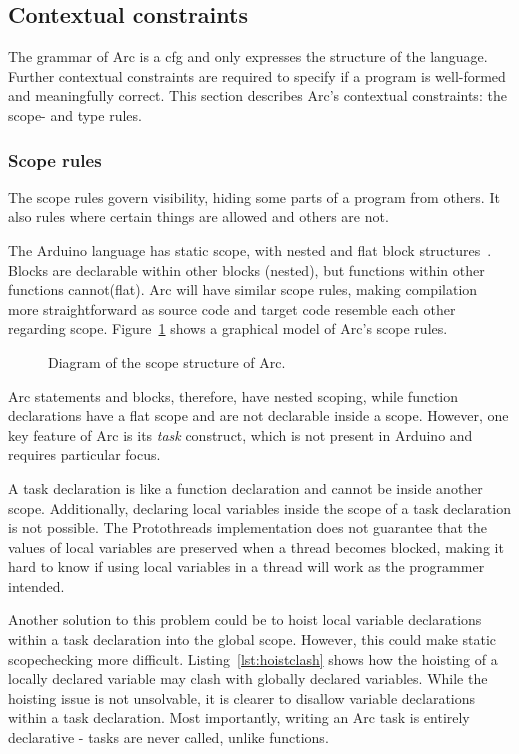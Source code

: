 \subsection{Contextual constraints}\label{subsec:contextualrestraints}
The grammar of Arc is a \gls{cfg} and only expresses the structure of the language. Further contextual constraints are required to specify if a program is well-formed and meaningfully correct. This section describes Arc's contextual constraints: the scope- and type rules.

\subsubsection{Scope rules}
The scope rules govern visibility, hiding some parts of a program from others. It also rules where certain things are allowed and others are not.

The Arduino language has static scope, with nested and flat block structures~\cite{cppref}. Blocks are declarable within other blocks (nested), but functions within other functions cannot(flat). Arc will have similar scope rules, making compilation more straightforward as source code and target code resemble each other regarding scope. Figure~\ref{fig:arcscoperules} shows a graphical model of Arc's scope rules.


\begin{figure}[htbp]
  \centering
  \caption{Diagram of the scope structure of Arc.}
  \label{fig:arcscoperules}
\end{figure}


Arc statements and blocks, therefore, have nested scoping, while function declarations have a flat scope and are not declarable inside a scope. However, one key feature of Arc is its \textit{task} construct, which is not present in Arduino and requires particular focus.

A task declaration is like a function declaration and cannot be inside another scope. Additionally, declaring local variables inside the scope of a task declaration is not possible. The Protothreads implementation does not guarantee that the values of local variables are preserved when a thread becomes blocked, making it hard to know if using local variables in a thread will work as the programmer intended.

Another solution to this problem could be to hoist local variable declarations within a task declaration into the global scope. However, this could make static scopechecking more difficult. Listing~\ref{lst:hoistclash} shows how the hoisting of a locally declared variable may clash with globally declared variables. While the hoisting issue is not unsolvable, it is clearer to disallow variable declarations within a task declaration. Most importantly, writing an Arc task is entirely declarative - tasks are never called, unlike functions.


